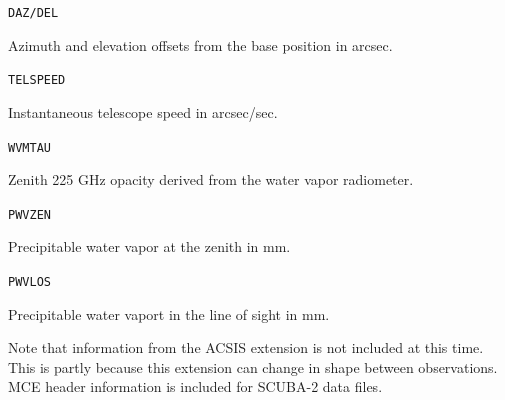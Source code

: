 \documentclass[twoside,11pt]{article}
\renewcommand{\_}{\texttt{\symbol{95}}}
\newcommand{\sstitem}{\item}
\newcommand{\sstitem}{\item}
\begin{document}
{{{      \sstitem \texttt{DAZ/DEL}

      Azimuth and elevation offsets from the base position in arcsec.

      \sstitem \texttt{TELSPEED}

      Instantaneous telescope speed in arcsec/sec.

      \sstitem \texttt{WVMTAU}

      Zenith 225 GHz opacity derived from the water vapor radiometer.

      \sstitem \texttt{PWVZEN}

      Precipitable water vapor at the zenith in mm.

      \sstitem \texttt{PWVLOS}

      Precipitable water vaport in the line of sight in mm.

    }

    Note that information from the ACSIS extension is not included at
    this time. This is partly because this extension can change in
    shape between observations.
    MCE header information is included for SCUBA-2 data files.
  }
}
\end{document}
